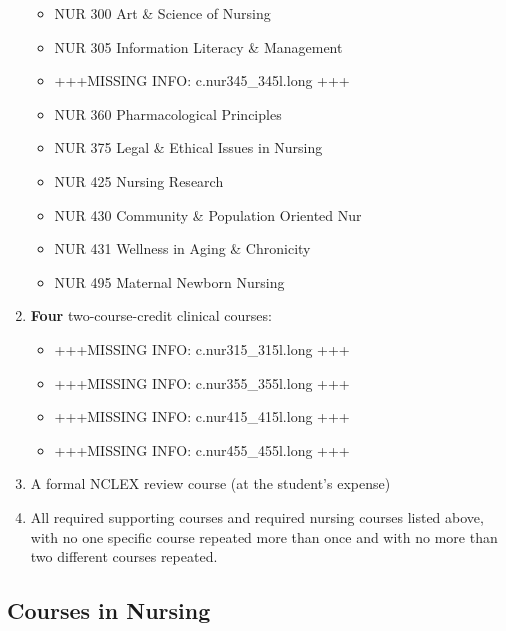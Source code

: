 \documentclass[
  letterpaper,
]{scrbook}
\providecommand{\tightlist}{%
  \setlength{\itemsep}{0pt}\setlength{\parskip}{0pt}}
\begin{document}
\begin{enumerate}
  \begin{itemize}
  \tightlist
  \item
    NUR 300 Art \& Science of Nursing
  \item
    NUR 305 Information Literacy \& Management
  \item
    +++MISSING INFO: c.nur345\_345l.long +++
  \item
    NUR 360 Pharmacological Principles
  \item
    NUR 375 Legal \& Ethical Issues in Nursing
  \item
    NUR 425 Nursing Research
  \item
    NUR 430 Community \& Population Oriented Nur
  \item
    NUR 431 Wellness in Aging \& Chronicity
  \item
    NUR 495 Maternal Newborn Nursing
  \end{itemize}
\item
  \textbf{Four} two-course-credit clinical courses:

  \begin{itemize}
  \tightlist
  \item
    +++MISSING INFO: c.nur315\_315l.long +++
  \item
    +++MISSING INFO: c.nur355\_355l.long +++
  \item
    +++MISSING INFO: c.nur415\_415l.long +++
  \item
    +++MISSING INFO: c.nur455\_455l.long +++
  \end{itemize}
\item
  A formal NCLEX review course (at the student's expense)
\item
  All required supporting courses and required nursing courses listed
  above, with no one specific course repeated more than once and with no
  more than two different courses repeated.
\end{enumerate}

\subsection{Courses in Nursing}\label{courses-in-nursing}
\end{document}
